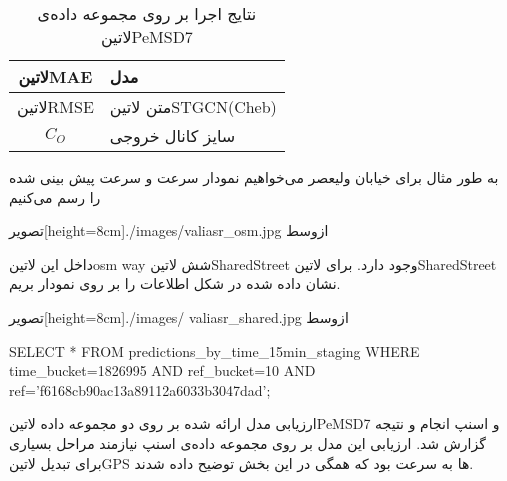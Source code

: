 \begin{table}[h]
  \centering
  \caption{نتایج اجرا بر روی مجموعه داده‌ی  لاتین{PeMSD7}}
  \begin{tabular}{|c|p{}|}
    \hline
     لاتین{MAE} & مدل \\
    \hline
     لاتین{RMSE} & متن لاتین{STGCN(Cheb)} \\
     $C_{O}$ & سایز کانال خروجی \\
    \hline
  \end{tabular}
  \label{tbl:distance}
\end{table}

به طور مثال برای خیابان ولیعصر می‌خواهیم نمودار سرعت و سرعت پیش بینی شده را رسم می‌کنیم

  ‌تصویر[height=8cm]{./images/valiasr_osm.jpg}
  ‌ازوسط

 داخل این  لاتین{osm way} شش  لاتین{SharedStreet} وجود دارد. برای  لاتین{SharedStreet} نشان داده شده در شکل اطلاعات را بر روی نمودار بریم.

  ‌تصویر[height=8cm]{./images/ valiasr_shared.jpg}
  ‌ازوسط

 SELECT * FROM predictions_by_time_15min_staging WHERE time_bucket=1826995 AND ref_bucket=10 AND ref='f6168cb90ac13a89112a6033b3047dad';

 ارزیابی مدل ارائه شده بر روی دو مجموعه داده  لاتین{PeMSD7} و اسنپ انجام و نتیجه گزارش شد. ارزیابی این مدل بر روی مجموعه داده‌ی اسنپ نیازمند مراحل بسیاری برای تبدیل  لاتین{GPS} ها به سرعت بود که همگی در این بخش توضیح داده شدند.
